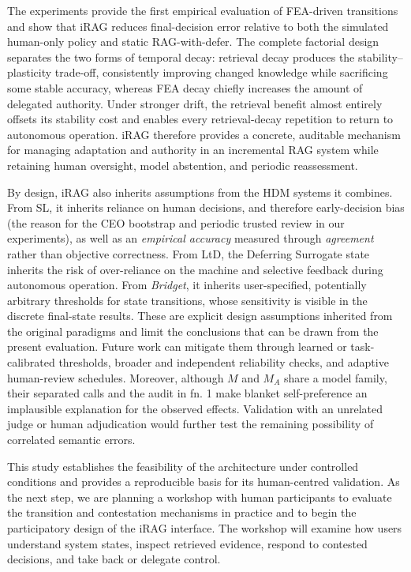 \documentclass[a4paper,twoside]{article}
\begin{document}
The experiments provide the first empirical evaluation of FEA-driven transitions and show that iRAG reduces final-decision error relative to both the simulated human-only policy and static RAG-with-defer. The complete factorial design separates the two forms of temporal decay: retrieval decay produces the stability--plasticity trade-off, consistently improving changed knowledge while sacrificing some stable accuracy, whereas FEA decay chiefly increases the amount of delegated authority. Under stronger drift, the retrieval benefit almost entirely offsets its stability cost and enables every retrieval-decay repetition to return to autonomous operation. iRAG therefore provides a concrete, auditable mechanism for managing adaptation and authority in an incremental RAG system while retaining human oversight, model abstention, and periodic reassessment.

By design, iRAG also inherits assumptions from the HDM systems it combines. From SL, it inherits reliance on human decisions, and therefore early-decision bias (the reason for the CEO bootstrap and periodic trusted review in our experiments), as well as an \textit{empirical accuracy} measured through \textit{agreement} rather than objective correctness. From LtD, the Deferring Surrogate state inherits the risk of over-reliance on the machine and selective feedback during autonomous operation. From \textit{Bridget}, it inherits user-specified, potentially arbitrary thresholds for state transitions, whose sensitivity is visible in the discrete final-state results. These are explicit design assumptions inherited from the original paradigms and limit the conclusions that can be drawn from the present evaluation. Future work can mitigate them through learned or task-calibrated thresholds, broader and independent reliability checks, and adaptive human-review schedules. Moreover, although $M$ and $M_A$ share a model family, their separated calls and the audit in fn. 1 make blanket self-preference an implausible explanation for the observed effects. Validation with an unrelated judge or human adjudication would further test the remaining possibility of correlated semantic errors.

This study establishes the feasibility of the architecture under controlled conditions and provides a reproducible basis for its human-centred validation. As the next step, we are planning a workshop with human participants to evaluate the transition and contestation mechanisms in practice and to begin the participatory design of the iRAG interface. The workshop will examine how users understand system states, inspect retrieved evidence, respond to contested decisions, and take back or delegate control. 
\end{document}
